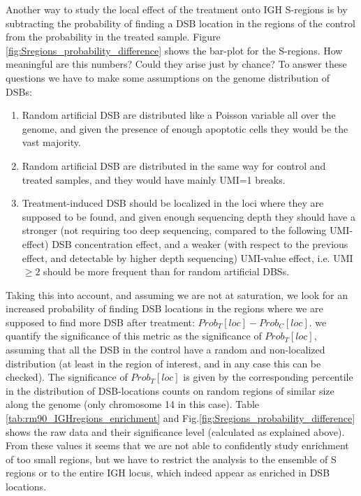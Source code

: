 \documentclass[11pt,a4paper]{article}
\begin{document}
Another way to study the local effect of the treatment onto IGH S-regions is by subtracting the probability of finding a DSB location in the regions of the control from the probability in the treated sample. Figure \ref{fig:Sregions_probability_difference} shows the bar-plot for the S-regions. How meaningful are this numbers? Could they arise just by chance? To answer these questions we have to make some assumptions on the genome distribution of DSBs:
\begin{enumerate}
\item Random artificial DSB are distributed like a Poisson variable all over the genome, and given the presence of enough apoptotic cells they would be the vast majority.
\item Random artificial DSB are distributed in the same way for control and treated samples, and they would have mainly UMI=1 breaks.
\item Treatment-induced DSB should be localized in the loci where they are supposed to be found, and given enough sequencing depth they should have a stronger (not requiring too deep sequencing, compared to the following UMI-effect) DSB concentration effect, and a weaker (with respect to the previous effect, and detectable by higher depth sequencing) UMI-value effect, i.e. UMI$\geq 2$ should be more frequent than for random artificial DBSs.
\end{enumerate}
Taking this into account, and assuming we are not at saturation, we look for an increased probability of finding DSB locations in the regions where we are supposed to find more DSB after treatment: $Prob_T\left[loc\right]-Prob_C\left[loc\right]$. we quantify the significance of this metric as the significance of $Prob_T\left[loc\right]$, assuming that all the DSB in the 
control have a random and non-localized distribution (at least in the region of interest, and in any case this can be checked). The significance of $Prob_T\left[loc\right]$ is given by the corresponding percentile in the distribution of DSB-locations counts on random regions of similar size along the genome (only chromosome 14 in this case). Table \ref{tab:rm90_IGHregions_enrichment} and Fig.\ref{fig:Sregions_probability_difference} shows the 
raw data and their significance level (calculated as explained above). From these values it seems that we are not able to confidently study enrichment of too small regions, but we have to restrict the analysis to the ensemble of S regions or to the entire IGH locus, which indeed appear as enriched in DSB locations. 
\end{document}

